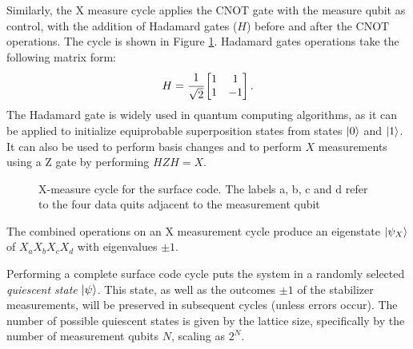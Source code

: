Similarly, the X measure cycle applies the CNOT gate with the measure qubit as control, with the addition of Hadamard gates ($H$) before and after the CNOT operations. The cycle is shown in Figure \ref{fig:Xmeasurecycle}. Hadamard gates operations take the following matrix form:
\begin{equation}
    H=\cfrac{1}{\sqrt{2}}\begin{bmatrix}
        1&1\\
        1&-1
    \end{bmatrix}.
\end{equation}
The Hadamard gate is widely used in quantum computing algorithms, as it can be applied to initialize equiprobable superposition states from states $\ket{0}$ and $\ket{1}$. It can also be used to perform basis changes and to perform $X$ measurements using a Z gate by performing $HZH=X$.
\begin{figure}
    \centering
    \caption[X-measure cycle for the surface code]{X-measure cycle for the surface code. The labels a, b, c and d refer to the four data quits adjacent to the measurement qubit}
    \label{fig:Xmeasurecycle}
\end{figure}
The combined operations on an X measurement cycle produce an eigenstate $\ket{\psi_X}$ of $X_aX_bX_cX_d$ with eigenvalues $\pm 1$.

Performing a complete surface code cycle puts the system in a randomly selected \textit{quiescent state} $\ket{\psi}$. This state, as well as the outcomes $\pm 1$ of the stabilizer measurements, will be preserved in subsequent cycles (unless errors occur). The number of possible quiescent states is given by the lattice size, specifically by the number of measurement qubits $N$, scaling as $2^N$.

